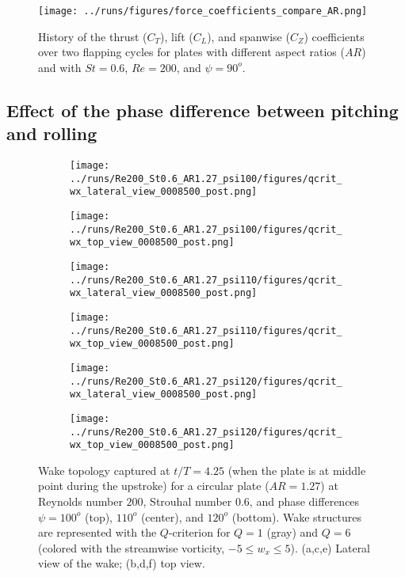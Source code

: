 \begin{figure}
  \centering
  \texttt{[image: ../runs/figures/force\_coefficients\_compare\_AR.png]}
  \caption{History of the thrust ($C_T$), lift ($C_L$), and spanwise ($C_Z$) coefficients over two flapping cycles for plates with different aspect ratios ($AR$) and with $St = 0.6$, $Re = 200$, and $\psi = 90^o$.}
  \label{fig:ratio_force_coefficients}
\end{figure}

\subsection{Effect of the phase difference between pitching and rolling}

\begin{figure}
  \centering
  \begin{subfigure}[]{0.45\textwidth}
    \centering
    \texttt{[image: ../runs/Re200\_St0.6\_AR1.27\_psi100/figures/qcrit\_wx\_lateral\_view\_0008500\_post.png]}
    \caption{}
  \end{subfigure}
  \hfill
  \begin{subfigure}[]{0.45\textwidth}
    \centering
    \texttt{[image: ../runs/Re200\_St0.6\_AR1.27\_psi100/figures/qcrit\_wx\_top\_view\_0008500\_post.png]}
    \caption{}
  \end{subfigure}
  \vspace{1cm}
  \begin{subfigure}[]{0.45\textwidth}
    \centering
    \texttt{[image: ../runs/Re200\_St0.6\_AR1.27\_psi110/figures/qcrit\_wx\_lateral\_view\_0008500\_post.png]}
    \caption{}
  \end{subfigure}
  \hfill
  \begin{subfigure}[]{0.45\textwidth}
    \centering
    \texttt{[image: ../runs/Re200\_St0.6\_AR1.27\_psi110/figures/qcrit\_wx\_top\_view\_0008500\_post.png]}
    \caption{}
  \end{subfigure}
  \vspace{1cm}
  \begin{subfigure}[]{0.45\textwidth}
    \centering
    \texttt{[image: ../runs/Re200\_St0.6\_AR1.27\_psi120/figures/qcrit\_wx\_lateral\_view\_0008500\_post.png]}
    \caption{}
  \end{subfigure}
  \hfill
  \begin{subfigure}[]{0.45\textwidth}
    \centering
    \texttt{[image: ../runs/Re200\_St0.6\_AR1.27\_psi120/figures/qcrit\_wx\_top\_view\_0008500\_post.png]}
    \caption{}
  \end{subfigure}
  \caption{Wake topology captured at $t / T = 4.25$ (when the plate is at middle point during the upstroke) for a circular plate ($AR = 1.27$) at Reynolds number $200$, Strouhal number $0.6$, and phase differences $\psi = 100^o$ (top), $110^o$ (center), and $120^o$ (bottom). Wake structures are represented with the $Q$-criterion for $Q = 1$ (gray) and $Q = 6$ (colored with the streamwise vorticity, $-5 \leq w_x \leq 5$). (a,c,e) Lateral view of the wake; (b,d,f) top view.}
  \label{fig:phase_wake_topology}
\end{figure}

